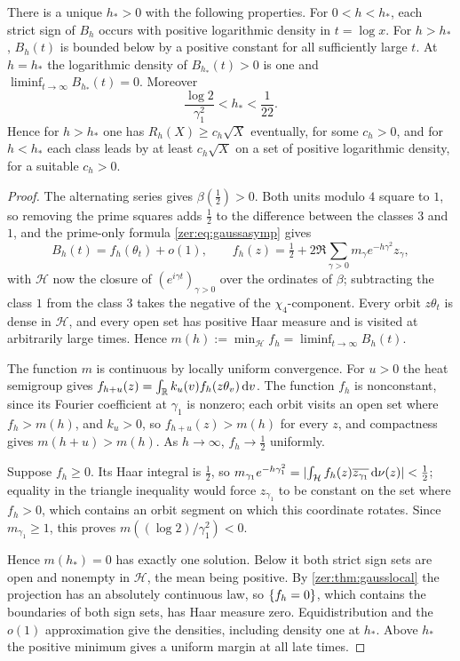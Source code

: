 \begin{theorem}\label{zer:thm:gausstransition}
There is a unique $h_*>0$ with the following properties. For $0<h<h_*$, each strict sign of
$B_h$ occurs with positive logarithmic density in $t=\log x$. For $h>h_*$, $B_h(t)$ is bounded
below by a positive constant for all sufficiently large $t$. At $h=h_*$ the logarithmic density
of $B_{h_*}(t)>0$ is one and $\liminf_{t\to\infty}B_{h_*}(t)=0$. Moreover
\[
 \frac{\log2}{\gamma_1^2}<h_*<\frac1{22}.
\]
Hence for $h>h_*$ one has $R_h(X)\ge c_h\sqrt X$ eventually, for some $c_h>0$, and for $h<h_*$
each class leads by at least $c_h\sqrt X$ on a set of positive logarithmic density, for a
suitable $c_h>0$.
\end{theorem}
\begin{proof}
The alternating series gives $\beta(\tfrac12)>0$. Both units modulo $4$ square to $1$, so removing
the prime squares adds $\tfrac12$ to the difference between the classes $3$ and $1$, and the
prime-only formula \eqref{zer:eq:gaussasymp} gives
\[
 B_h(t)=f_h(\theta_t)+o(1),\qquad f_h(z)=\tfrac12+2\Re\sum_{\gamma>0}m_\gamma e^{-h\gamma^2}z_\gamma ,
\]
with $\mathcal H$ now the closure of $(e^{i\gamma t})_{\gamma>0}$ over the ordinates of $\beta$;
subtracting the class $1$ from the class $3$ takes the negative of the $\chi_4$-component.
Every orbit $z\theta_t$ is dense in $\mathcal H$, and every open set has positive Haar measure and
is visited at arbitrarily large times. Hence $m(h):=\min_{\mathcal H}f_h=\liminf_{t\to\infty}B_h(t)$.

The function $m$ is continuous by locally uniform convergence. For $u>0$ the heat semigroup gives
$f_{h+u}(z)=\int_{\mathbb{R}} k_u(v)f_h(z\theta_v)\,\mathrm{d} v$. The function $f_h$ is nonconstant, since its
Fourier coefficient at $\gamma_1$ is nonzero; each orbit visits an open set where $f_h>m(h)$, and
$k_u>0$, so $f_{h+u}(z)>m(h)$ for every $z$, and compactness gives $m(h+u)>m(h)$. As
$h\to\infty$, $f_h\to\tfrac12$ uniformly.

Suppose $f_h\ge0$. Its Haar integral is $\tfrac12$, so
$m_{\gamma_1}e^{-h\gamma_1^2}=\lvert\int_{\mathcal H}f_h(z)\overline{z_{\gamma_1}}\,\mathrm{d}\nu(z)\rvert<\tfrac12$;
equality in the triangle inequality would force $z_{\gamma_1}$ to be constant on the set where
$f_h>0$, which contains an orbit segment on which this coordinate rotates. Since
$m_{\gamma_1}\ge1$, this proves $m((\log2)/\gamma_1^2)<0$.

Hence $m(h_*)=0$ has exactly one solution. Below it both strict sign sets are open and nonempty
in $\mathcal H$, the mean being positive. By \cref{zer:thm:gausslocal} the projection has an
absolutely continuous law, so $\{f_h=0\}$, which contains the boundaries of both sign sets, has
Haar measure zero. Equidistribution and the $o(1)$ approximation give the densities, including
density one at $h_*$. Above $h_*$ the positive minimum gives a uniform margin at all late times.


\end{proof}
